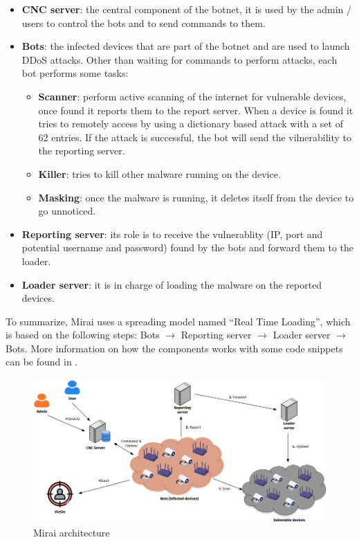 \begin{itemize}
    \item \textbf{CNC server}: the central component of the botnet, it is used by the admin / users to control the bots and to send commands to them.
    \item \textbf{Bots}: the infected devices that are part of the botnet and are used to launch DDoS attacks. Other than waiting for commands to perform attacks, each bot performs some tasks:
    \begin{itemize}
        \item \textbf{Scanner}: perform active scanning of the internet for vulnerable devices, once found it reports them to the report server. When a device is found it tries to remotely access by using a dictionary based attack with a set of 62 entries. If the attack is successful, the bot will send the vilnerability to the reporting server.
        \item \textbf{Killer}: tries to kill other malware running on the device.
        \item \textbf{Masking}: once the malware is running, it deletes itself from the device to go unnoticed.
    \end{itemize}
    \item \textbf{Reporting server}: its role is to receive the vulnerablity (IP, port and potential username and password) found by the bots and forward them to the loader. 
    \item \textbf{Loader server}: it is in charge of loading the malware on the reported devices. 
\end{itemize}

To summarize, Mirai uses a spreading model named ``Real Time Loading'', which is based on the following steps: Bots $\rightarrow$ Reporting server $\rightarrow$ Loader server $\rightarrow$ Bots. \cite{de2018ddos} More information on how the components works with some code snippets can be found in .


\begin{figure}[ht]
    \centering
    \includegraphics[scale=0.5]{resources/images/mirai-architecture.png}
    \caption{Mirai architecture}
    \label{fig:mirai-architecture}
\end{figure}